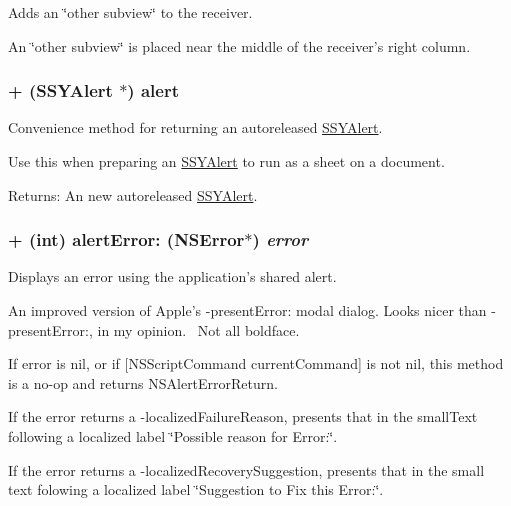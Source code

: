 Adds an \char`\"{}other subview\char`\"{} to the receiver. 

An \char`\"{}other subview\char`\"{} is placed near the middle of the receiver's right column. \hypertarget{interface_s_s_y_alert_2af19780d34ceac4d2900b5f8c2178fe}{
\subsubsection[{alert}]{\setlength{\rightskip}{0pt plus 5cm}+ ({\bf SSYAlert} $\ast$) alert }}
\label{interface_s_s_y_alert_2af19780d34ceac4d2900b5f8c2178fe}


Convenience method for returning an autoreleased \hyperlink{interface_s_s_y_alert}{SSYAlert}. 

Use this when preparing an \hyperlink{interface_s_s_y_alert}{SSYAlert} to run as a sheet on a document.

\begin{Desc}
\item[Returns:]An new autoreleased \hyperlink{interface_s_s_y_alert}{SSYAlert}. \end{Desc}
\hypertarget{interface_s_s_y_alert_5665fce58be755ad7d1e1ed5461512c5}{
\subsubsection[{alertError:}]{\setlength{\rightskip}{0pt plus 5cm}+ (int) alertError: (NSError$\ast$) {\em error}}}
\label{interface_s_s_y_alert_5665fce58be755ad7d1e1ed5461512c5}


Displays an error using the application's shared alert. 

An improved version of Apple's -presentError: modal dialog. Looks nicer than -presentError:, in my opinion.~ Not all boldface.

If error is nil, or if \mbox{[}NSScriptCommand currentCommand\mbox{]} is not nil, this method is a no-op and returns NSAlertErrorReturn.

If the error returns a -localizedFailureReason, presents that in the smallText following a localized label \char`\"{}Possible reason for Error:\char`\"{}.

If the error returns a -localizedRecoverySuggestion, presents that in the small text folowing a localized label \char`\"{}Suggestion to Fix this Error:\char`\"{}.

